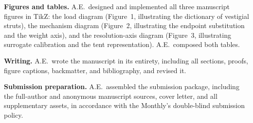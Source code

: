 \documentclass{article}
\begin{document}
\medskip
\noindent\textbf{Figures and tables.}
A.E.\ designed and implemented all three manuscript figures in TikZ:
the load diagram (Figure~1, illustrating the dictionary of vestigial
struts), the mechanism diagram (Figure~2, illustrating the endpoint
substitution and the weight axis), and the resolution-axis diagram
(Figure~3, illustrating surrogate calibration and the tent
representation). A.E.\ composed both tables.

\medskip
\noindent\textbf{Writing.}
A.E.\ wrote the manuscript in its entirety, including all sections,
proofs, figure captions, backmatter, and bibliography, and revised it.

\medskip
\noindent\textbf{Submission preparation.}
A.E.\ assembled the submission package, including the full-author and
anonymous manuscript sources, cover letter, and all supplementary
assets, in accordance with the Monthly's double-blind submission policy.
\end{document}

